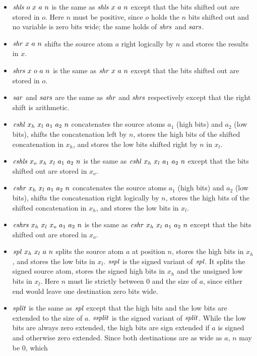 \documentclass{article}
\begin{document}
\begin{itemize}
\item $\mathit{shls}\ o\ x\ a\ n$ is the same as $\mathit{shls}\ x\ a\ n$ except
  that the bits shifted out are stored in $o$.
  Here $n$ must be positive, since $o$ holds the $n$ bits shifted out
  and no variable is zero bits wide; the same holds of $\mathit{shrs}$ and
  $\mathit{sars}$.
\item $\mathit{shr}\ x\ a\ n$ shifts the source atom $a$ right logically by
  $n$ and stores the results in $x$.
\item $\mathit{shrs}\ x\ o\ a\ n$ is the same as $\mathit{shr}\ x\ a\ n$ except that
  the bits shifted out are stored in $o$.
\item $\mathit{sar}$ and $\mathit{sars}$ are the same as $\mathit{shr}$ and $\mathit{shrs}$
  respectively except that the right shift is arithmetic.
\item $\mathit{cshl}\ x_h\ x_l\ a_1\ a_2\ n$ concatenates the source atoms
  $a_1$ (high bits) and $a_2$ (low bits), shifts the concatenation
  left by $n$, stores the high bits of the shifted concatenation in
  $x_h$, and stores the low bits shifted right by $n$ in $x_l$.
\item $\icshls\ x_o\ x_h\ x_l\ a_1\ a_2\ n$ is the same as $\mathit{cshl}\
  x_h\ x_l\ a_1\ a_2\ n$ except that the bits shifted out are stored
  in $x_o$.
\item $\mathit{cshr}\ x_h\ x_l\ a_1\ a_2\ n$ concatenates the source atoms
  $a_1$ (high bits) and $a_2$ (low bits), shifts the concatenation
  right logically by $n$, stores the high bits of the shifted
  concatenation in $x_h$, and stores the low bits in $x_l$.
\item $\icshrs\ x_h\ x_l\ x_o\ a_1\ a_2\ n$ is the same as $\mathit{cshr}\
  x_h\ x_l\ a_1\ a_2\ n$ except that the bits shifted out are stored
  in $x_o$.
\item $\mathit{spl}\ x_h\ x_l\ a\ n$ splits the source atom $a$ at position
  $n$, stores the high bits in $x_h$, and stores the low bits in
  $x_l$. $\mathit{sspl}$ is the signed variant of $\mathit{spl}$. It splits the
  signed source atom, stores the signed high bits in $x_h$ and the
  unsigned low bits in $x_l$.
  Here $n$ must lie strictly between $0$ and the size of $a$, since
  either end would leave one destination zero bits wide.
\item $\mathit{split}$ is the same as $\mathit{spl}$ except that the high bits and
  the low bits are extended to the size of $a$. $\mathit{ssplit}$ is the
  signed variant of $\mathit{split}$.
  While the low bits are always zero extended, the high bits are sign
  extended if $a$ is signed and otherwise zero extended.
  Since both destinations are as wide as $a$, $n$ may be $0$, which

\end{itemize}
\end{document}
